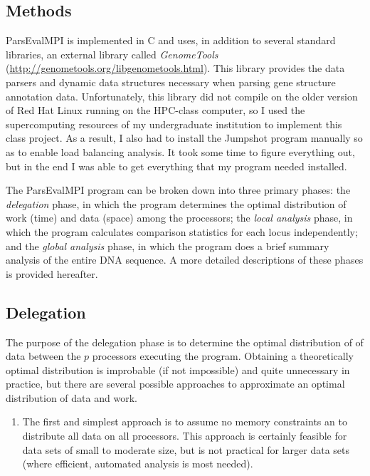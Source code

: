 \documentclass{bioinfo}
\begin{document}
\begin{methods}
\section*{Methods}
ParsEvalMPI is implemented in C and uses, in addition to several standard libraries, an external library called \textit{GenomeTools} (\url{http://genometools.org/libgenometools.html}). This library provides the data parsers and dynamic data structures necessary when parsing gene structure annotation data. Unfortunately, this library did not compile on the older version of Red Hat Linux running on the HPC-class computer, so I used the supercomputing resources of my undergraduate institution to implement this class project. As a result, I also had to install the Jumpshot program manually so as to enable load balancing analysis. It took some time to figure everything out, but in the end I was able to get everything that my program needed installed.

The ParsEvalMPI program can be broken down into three primary phases: the \textit{delegation} phase, in which the program determines the optimal distribution of work (time) and data (space) among the processors; the \textit{local analysis} phase, in which the program calculates comparison statistics for each locus independently; and the \textit{global analysis} phase, in which the program does a brief summary analysis of the entire DNA sequence. A more detailed descriptions of these phases is provided hereafter.

\subsection*{Delegation}
The purpose of the delegation phase is to determine the optimal distribution of of data between the $p$ processors executing the program. Obtaining a theoretically optimal distribution is improbable (if not impossible) and quite unnecessary in practice, but there are several possible approaches to approximate an optimal distribution of data and work.

\begin{enumerate}
  \item The first and simplest approach is to assume no memory constraints an to distribute all data on all processors. This approach is certainly feasible for data sets of small to moderate size, but is not practical for larger data sets (where efficient, automated analysis is most needed).


\end{enumerate}
\end{methods}
\end{document}
